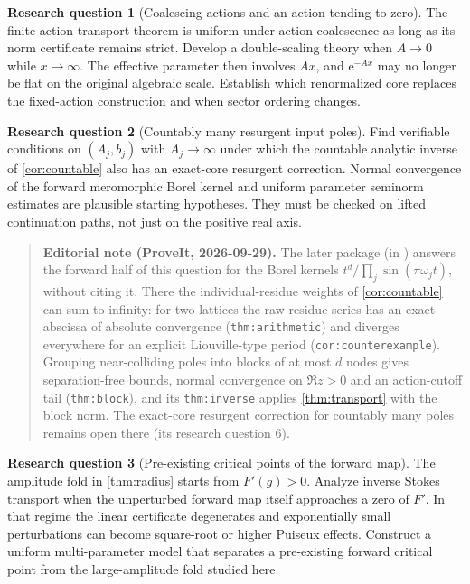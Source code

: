 \documentclass[11pt,a4paper]{article}
\numberwithin{equation}{section}
\theoremstyle{definition}
\newtheorem{problem}{Research question}
\theoremstyle{remark}
\newcommand{\e}{\mathrm e}
\begin{document}
\begin{problem}[Coalescing actions and an action tending to zero]
The finite-action transport theorem is uniform under action coalescence as long as its norm certificate remains strict. Develop a double-scaling theory when $A\to0$ while $x\to\infty$. The effective parameter then involves $Ax$, and $\e^{-Ax}$ may no longer be flat on the original algebraic scale. Establish which renormalized core replaces the fixed-action construction and when sector ordering changes.
\end{problem}

\begin{problem}[Countably many resurgent input poles]
Find verifiable conditions on $(A_j,b_j)$ with $A_j\to\infty$ under which the countable analytic inverse of \cref{cor:countable} also has an exact-core resurgent correction. Normal convergence of the forward meromorphic Borel kernel and uniform parameter seminorm estimates are plausible starting hypotheses. They must be checked on lifted continuation paths, not just on the positive real axis.
\end{problem}

\begin{quote}\small\textbf{Editorial note (ProveIt, 2026-09-29).} The later package  (in ) answers the forward half of this question for the Borel kernels $t^d/\prod_j\sin(\pi\omega_jt)$, without citing it. There the individual-residue weights of \cref{cor:countable} can sum to infinity: for two lattices the raw residue series has an exact abscissa of absolute convergence (\texttt{thm:arithmetic}) and diverges everywhere for an explicit Liouville-type period (\texttt{cor:counterexample}). Grouping near-colliding poles into blocks of at most $d$ nodes gives separation-free bounds, normal convergence on $\Re z>0$ and an action-cutoff tail (\texttt{thm:block}), and its \texttt{thm:inverse} applies \cref{thm:transport} with the block norm. The exact-core resurgent correction for countably many poles remains open there (its research question 6).\end{quote}

\begin{problem}[Pre-existing critical points of the forward map]
The amplitude fold in \cref{thm:radius} starts from $F'(g)>0$. Analyze inverse Stokes transport when the unperturbed forward map itself approaches a zero of $F'$. In that regime the linear certificate degenerates and exponentially small perturbations can become square-root or higher Puiseux effects. Construct a uniform multi-parameter model that separates a pre-existing forward critical point from the large-amplitude fold studied here.
\end{problem}
\end{document}
